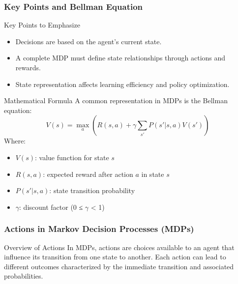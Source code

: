 \documentclass[aspectratio=169]{beamer}
\begin{document}
\begin{frame}[fragile]
    \frametitle{Key Points and Bellman Equation}
    \begin{block}{Key Points to Emphasize}
        \begin{itemize}
            \item Decisions are based on the agent's current state.
            \item A complete MDP must define state relationships through actions and rewards.
            \item State representation affects learning efficiency and policy optimization.
        \end{itemize}
    \end{block}

    \begin{block}{Mathematical Formula}
        A common representation in MDPs is the Bellman equation:
        \begin{equation}
            V(s) = \max_a \left( R(s, a) + \gamma \sum_{s'} P(s' | s, a) V(s') \right)
        \end{equation}
        Where:
        \begin{itemize}
            \item \( V(s) \): value function for state \( s \)
            \item \( R(s, a) \): expected reward after action \( a \) in state \( s \)
            \item \( P(s' | s, a) \): state transition probability
            \item \( \gamma \): discount factor (0 ≤ \( \gamma \) < 1)
        \end{itemize}
    \end{block}
\end{frame}

\begin{frame}[fragile]
    \frametitle{Actions in Markov Decision Processes (MDPs)}
    
    \begin{block}{Overview of Actions}
        In MDPs, actions are choices available to an agent that influence its transition from one state to another. Each action can lead to different outcomes characterized by the immediate transition and associated probabilities.
    \end{block}    
\end{frame}
\end{document}

